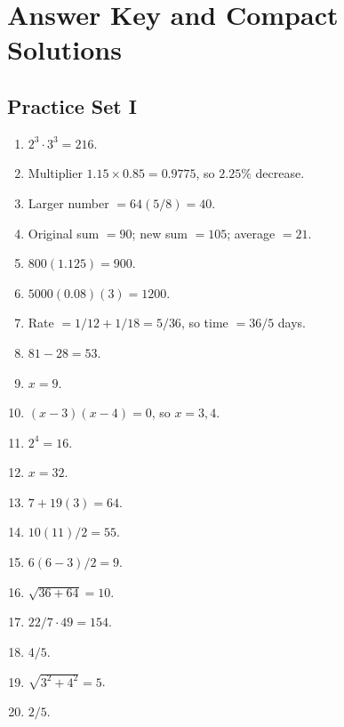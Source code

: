 \documentclass[12pt,a4paper,oneside]{book}
\begin{document}
\chapter[Answer Key]{Answer Key and Compact Solutions}
\section{Practice Set I}
\begin{enumerate}[label=\textbf{Q\arabic*.}, leftmargin=*]
\item \(2^3\cdot3^3=216\).
\item Multiplier \(1.15\times0.85=0.9775\), so \(2.25\%\) decrease.
\item Larger number \(=64(5/8)=40\).
\item Original sum \(=90\); new sum \(=105\); average \(=21\).
\item \(800(1.125)=900\).
\item \(5000(0.08)(3)=1200\).
\item Rate \(=1/12+1/18=5/36\), so time \(=36/5\) days.
\item \(81-28=53\).
\item \(x=9\).
\item \((x-3)(x-4)=0\), so \(x=3,4\).
\item \(2^4=16\).
\item \(x=32\).
\item \(7+19(3)=64\).
\item \(10(11)/2=55\).
\item \(6(6-3)/2=9\).
\item \(\sqrt{36+64}=10\).
\item \(22/7\cdot49=154\).
\item \(4/5\).
\item \(\sqrt{3^2+4^2}=5\).
\item \(2/5\).
\end{enumerate}
\end{document}
